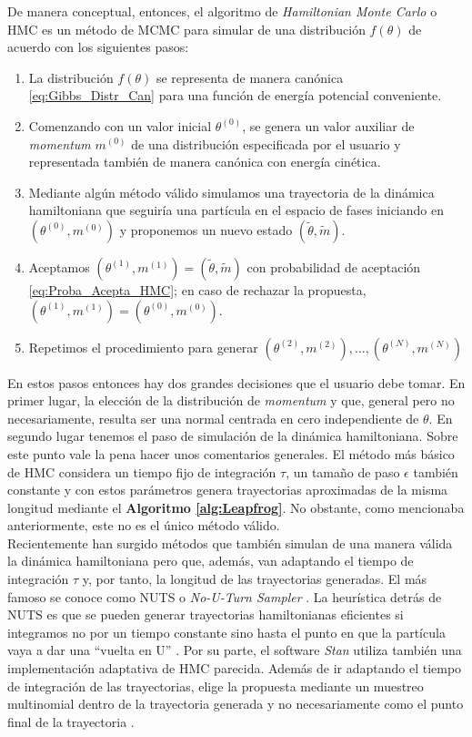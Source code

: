 De manera conceptual, entonces, el algoritmo de \textit{Hamiltonian Monte Carlo} o HMC es un método de MCMC para simular de una distribución $f(\theta)$ de acuerdo con los siguientes pasos: 
\begin{enumerate}
\item La distribución $f(\theta)$ se representa de manera canónica \eqref{eq:Gibbs_Distr_Can} para una función de energía potencial conveniente.
\item Comenzando con un valor inicial $\theta^{(0)}$, se genera un valor auxiliar de \textit{momentum} $m^{(0)}$ de una distribución especificada por el usuario y representada también de manera canónica con energía cinética.
\item Mediante algún método válido simulamos una trayectoria de la dinámica hamiltoniana que seguiría una partícula en el espacio de fases iniciando en $(\theta^{(0)},m^{(0)})$ y proponemos un nuevo estado $(\tilde{\theta},\tilde{m})$.
\item Aceptamos $(\theta^{(1)},m^{(1)})=(\tilde{\theta},\tilde{m})$ con probabilidad de aceptación \eqref{eq:Proba_Acepta_HMC}; en caso de rechazar la propuesta, $(\theta^{(1)},m^{(1)})=(\theta^{(0)},m^{(0)})$. 
\item Repetimos el procedimiento para generar $(\theta^{(2)},m^{(2)}),\dots,(\theta^{(N)},m^{(N)})$
\end{enumerate}

En estos pasos entonces hay dos grandes decisiones que el usuario debe tomar. En primer lugar, la elección de la distribución de \textit{momentum} y que, general pero no necesariamente, resulta ser una normal centrada en cero independiente de $\theta$. En segundo lugar tenemos el paso de simulación de la dinámica hamiltoniana. Sobre este punto vale la pena hacer unos comentarios generales. El método más básico de HMC considera un tiempo fijo de integración $\tau$, un tamaño de paso $\epsilon$ también constante y con estos parámetros genera  trayectorias aproximadas de la misma longitud mediante el \textbf{Algoritmo \ref{alg:Leapfrog}}. No obstante, como mencionaba anteriormente, este no es el único método válido.\\ 

Recientemente han surgido métodos que también simulan de una manera válida la dinámica hamiltoniana pero que, además, van adaptando el tiempo de integración $\tau$ y, por tanto, la longitud de las trayectorias generadas. El más famoso se conoce como NUTS o \textit{No-U-Turn Sampler} \parencite{NUTS11}. La heurística detrás de NUTS es que se pueden generar trayectorias hamiltonianas eficientes si integramos no por un tiempo constante sino hasta el punto en que la partícula vaya a dar una ``vuelta en U'' \parencite{Betancourt17,McElreath17}. Por su parte, el software \textit{Stan} utiliza también una implementación adaptativa de HMC parecida. Además de ir adaptando el tiempo de integración de las trayectorias, elige la propuesta mediante un muestreo multinomial dentro de la trayectoria generada y no necesariamente como el punto final de la trayectoria \parencite{Betancourt16,TuitSimpson18}. 

